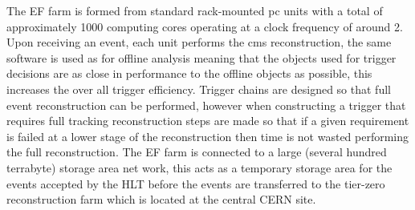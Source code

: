 The EF farm is formed from standard rack-mounted pc units with a total of 
approximately 1000 computing cores operating at a clock frequency of around 
\unit{2}{\giga\hertz}. Upon receiving an event, each unit performs the \ac{cms} 
reconstruction, the same software is used as for offline analysis meaning that 
the objects used for trigger decisions are as close in performance to the 
offline objects as possible, this increases the over all trigger efficiency. 
Trigger chains are designed so that full event reconstruction can be performed, 
however when constructing a trigger that requires full tracking reconstruction 
steps are made so that if a given requirement is failed at a lower stage of the 
reconstruction then time is not wasted performing the full reconstruction. The 
EF farm is connected to a large (several hundred terrabyte) storage area net 
work, this acts as a temporary storage area for the events accepted by the HLT 
before the events are transferred to the tier-zero reconstruction farm which is 
located at the central CERN site.






















